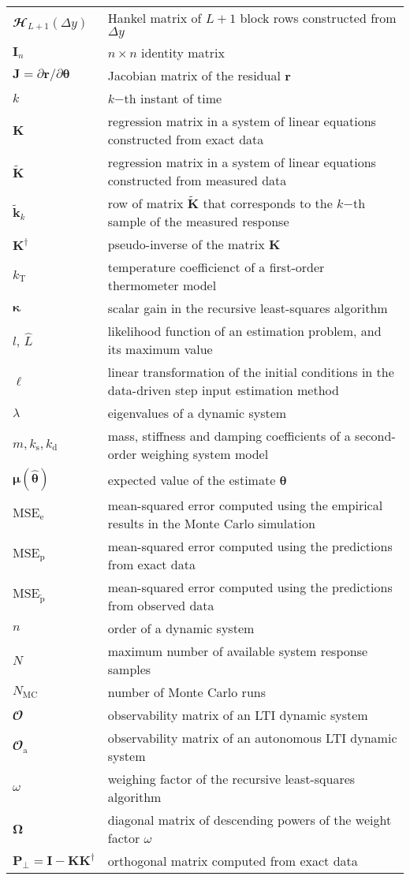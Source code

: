 \begin{longtable}[c]{>{\raggedleft}p{}>{\raggedright}p{}}
$\mathbfcal{H}_{L+1}(\Delta {y})$  &  Hankel matrix of $L+1$ block rows constructed from $\Delta {y}$  \tabularnewline
$\mathbf{I}_n$  & $n \times n$ identity matrix   \tabularnewline
$\mathbf{J} = \partial \mathbf{r} / \partial \bm{\theta}$  &  Jacobian matrix of the residual $\mathbf{r}$   \tabularnewline
$k$  &  $k\mathrm{-th}$ instant of time  \tabularnewline
$\mathbf{K}$  &  regression matrix in a system of linear equations constructed from exact data  \tabularnewline
$\widetilde{\mathbf{K}}$  &  regression matrix in a system of linear equations constructed from measured data  \tabularnewline
$\widetilde{\mathbf{k}}_{k}$  &  row of matrix $\widetilde{\mathbf{K}}$ that corresponds to the $k\mathrm{-th}$ sample of the measured response  \tabularnewline
$\mathbf{K}^\dagger$  &  pseudo-inverse of the matrix $\mathbf{K}$  \tabularnewline
$k_{\mathrm{T}}$  &   temperature coefficienct of a first-order thermometer model  \tabularnewline
$\bm{\kappa}$  &  scalar gain in the recursive least-squares algorithm  \tabularnewline
$l$, $\widehat{L}$  &  likelihood function of an estimation problem, and its maximum value  \tabularnewline
$\bm{\ell}$  &   linear transformation of the initial conditions in the data-driven step input estimation method  \tabularnewline
$\lambda$  &  eigenvalues of a dynamic system  \tabularnewline
$m, k_{\mathrm{s}}, k_{\mathrm{d}}$  &  mass, stiffness and damping coefficients of a second-order weighing system model  \tabularnewline
$\bm{\mu}\left(\widehat{\bm{\theta}} \right)$  &  expected value of the estimate $\bm{\theta}$  \tabularnewline
$\mathrm{MSE}_{\mathrm{e}}$  &  mean-squared error computed using the empirical results in the Monte Carlo simulation  \tabularnewline
$\mathrm{MSE}_{\mathrm{p}}$  &  mean-squared error computed using the predictions from exact data  \tabularnewline
$\mathrm{MSE}_{\widetilde{\mathrm{p}}}$  &  mean-squared error computed using the predictions from observed data  \tabularnewline
$n$  &  order of a dynamic system  \tabularnewline
$N$  &  maximum number of available system response samples   \tabularnewline
$N_{\mathrm{MC}}$  &  number of Monte Carlo runs   \tabularnewline
$\mathbfcal{O}$  &  observability matrix of an LTI dynamic system  \tabularnewline
$\mathbfcal{O}_\text{a}$  &  observability matrix of an autonomous LTI dynamic system  \tabularnewline
$\omega$   &  weighing factor of the recursive least-squares algorithm  \tabularnewline
$\bm{\Omega}$   &  diagonal matrix of descending powers of the weight factor $\omega$  \tabularnewline
$\mathbf{P}_\perp = \mathbf{I} - \mathbf{K} \mathbf{K}^\dagger$  &  orthogonal matrix computed from exact data  \tabularnewline

\end{longtable}
